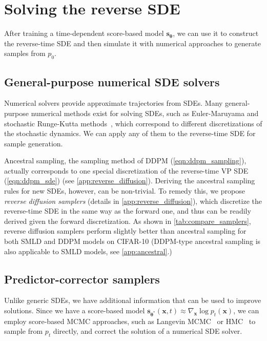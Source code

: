 \section{Solving the reverse SDE} After training a time-dependent score-based model $\mathbf{s}_{\boldsymbol{\theta}}$, we can use it to construct the reverse-time SDE and then simulate it with numerical approaches to generate samples from $p_0$. 

\subsection{General-purpose numerical SDE solvers}

Numerical solvers provide approximate trajectories from SDEs. Many general-purpose numerical methods exist for solving SDEs, such as Euler-Maruyama and stochastic Runge-Kutta methods~\citep{kloeden2013numerical}, which correspond to different discretizations of the stochastic dynamics. We can apply any of them to the reverse-time SDE for sample generation. 

Ancestral sampling, the sampling method of DDPM (\ref{eqn:ddpm_sampling}), actually corresponds to one special discretization of the reverse-time VP SDE (\ref{eqn:ddpm_sde}) (see \ref{app:reverse_diffusion}). Deriving the ancestral sampling rules for new SDEs, however, can be non-trivial. To remedy this, we propose \emph{reverse diffusion samplers} (details in \ref{app:reverse_diffusion}), which discretize the reverse-time SDE in the same way as the forward one, and thus can be readily derived given the forward discretization. As shown in \ref{tab:compare_samplers}, reverse diffusion samplers perform slightly better than ancestral sampling for both SMLD and DDPM models on CIFAR-10 (DDPM-type ancestral sampling is also applicable to SMLD models, see \ref{app:ancestral}.)

\subsection{Predictor-corrector samplers} Unlike generic SDEs, we have additional information that can be used to improve solutions. Since we have a score-based model $\mathbf{s}_{{\boldsymbol{\theta}}^*}(\mathbf{x}, t) \approx \nabla_\mathbf{x} \log p_t(\mathbf{x})$, we can employ score-based MCMC approaches, such as Langevin MCMC~\citep{parisi1981correlation,grenander1994representations} or HMC~\citep{neal2011mcmc} to sample from $p_t$ directly, and correct the solution of a numerical SDE solver. 

